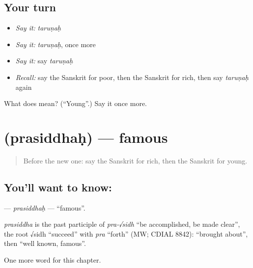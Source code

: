 \subsection*{Your turn}
\begin{itemize}
\raggedright
  \item \emph{Say it:} \emph{taruṇaḥ}
  \item \emph{Say it:} \emph{taruṇaḥ}, once more
  \item \emph{Say it:} say \emph{taruṇaḥ}
  \item \emph{Recall:} say the Sanskrit for poor, then the Sanskrit for rich, then say \emph{taruṇaḥ} again
\end{itemize}

\begin{tcolorbox}[breakable,colback=teal!4,colframe=teal!35!black,title={Before you move on}]
What does  mean? (\textquotedblleft{}Young\textquotedblright{}.) Say it once more.
\end{tcolorbox}
\section[\texorpdfstring{\sk{प्रसिद्धः} (prasiddhaḥ)}{प्रसिद्धः (prasiddhaḥ)}]{ (prasiddhaḥ) — famous}

\label{lesson:SA-C127-prasiddhah}



\begin{quote}
Before the new one: say the Sanskrit for rich, then the Sanskrit for young.
\end{quote}

\subsection*{You'll want to know: }
\textbf{} — \emph{prasiddhaḥ} — \textquotedblleft{}famous\textquotedblright{}.

\begin{cousinweb}
\emph{prasiddha} is the past participle of \emph{pra-√sidh} \textquotedblleft{}be accomplished, be made clear\textquotedblright{}, the root √sidh \textquotedblleft{}succeed\textquotedblright{} with \emph{pra} \textquotedblleft{}forth\textquotedblright{} (MW; CDIAL 8842): \textquotedblleft{}brought about\textquotedblright{}, then \textquotedblleft{}well known, famous\textquotedblright{}.
\end{cousinweb}

\begin{grammarlens}[title={What you've built}]
One more word for this chapter.
\end{grammarlens}

